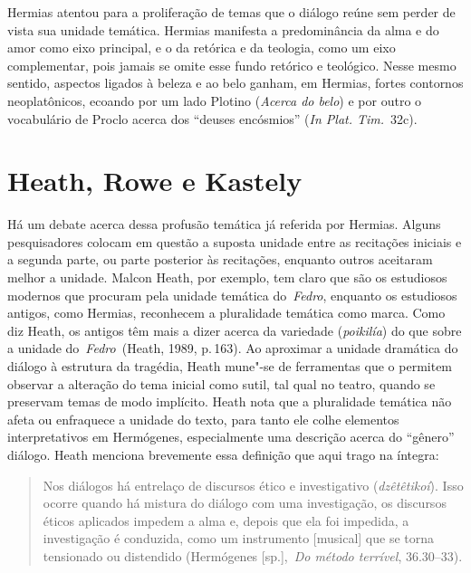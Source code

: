 Hermias atentou para a proliferação de temas que o diálogo reúne sem
perder de vista sua unidade temática. Hermias manifesta a predominância
da alma e do amor como eixo principal, e o da retórica e da teologia,
como um eixo complementar, pois jamais se omite esse fundo retórico e
teológico. Nesse mesmo sentido, aspectos ligados à beleza e ao belo
ganham, em Hermias, fortes contornos neoplatônicos, ecoando por um lado
Plotino (\emph{Acerca do belo}) e por outro o vocabulário de Proclo
acerca dos ``deuses encósmios'' (\emph{In Plat. Tim.}~32c).

 

\section{Heath, Rowe e Kastely}

 

Há um debate acerca dessa profusão temática já referida por Hermias.
Alguns pesquisadores colocam em questão a suposta unidade entre as
recitações iniciais e a segunda parte, ou parte posterior às recitações,
enquanto outros aceitaram melhor a unidade. Malcon Heath, por exemplo,
tem claro que são os estudiosos modernos que procuram pela unidade
temática do~\emph{Fedro}, enquanto os estudiosos antigos, como Hermias,
reconhecem a pluralidade temática como marca. Como diz Heath, os antigos
têm mais a dizer acerca da variedade (\emph{poikilía}) do que sobre a 
unidade do~\emph{Fedro~}(Heath, 1989, p.\,163). Ao aproximar a unidade
dramática do diálogo à estrutura da tragédia, Heath mune"-se de
ferramentas que o permitem observar a alteração do tema inicial como
sutil, tal qual no teatro, quando se preservam temas de modo implícito.
Heath nota que a pluralidade temática não afeta ou enfraquece a unidade
do texto, para tanto ele colhe elementos interpretativos em Hermógenes,
especialmente uma descrição acerca do ``gênero'' diálogo. Heath menciona
brevemente essa definição que aqui trago na íntegra:

 

\begin{quote}
Nos diálogos há entrelaço de discursos ético e investigativo
(\emph{dzêtêtikoí}). Isso ocorre quando há mistura do diálogo com uma
investigação, os discursos éticos aplicados impedem a alma e, depois que
ela foi impedida, a investigação é conduzida, como um instrumento
[musical] que se torna tensionado ou distendido (Hermógenes
[sp.],~\emph{Do método terrível}, 36.30--33).
\end{quote}

